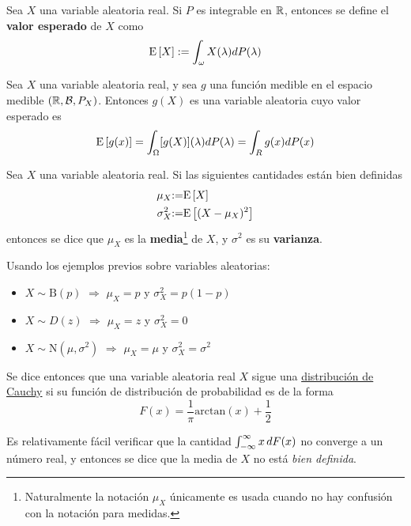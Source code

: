 \begin{definicion}
Sea $X$ una variable aleatoria real. Si $P$ es integrable en $\mathbb{R}$, entonces se define el \textbf{valor esperado} de $X$ como
\begin{equation}
\mathrm{E}\left[ X \right] := \int_\omega X(\lambda) dP(\lambda)
\end{equation}
\end{definicion}

\begin{proposicion}
Sea $X$ una variable aleatoria real, y sea $g$ una función medible en el espacio medible $(\mathbb{R},\mathcal{B},P_X)$. Entonces $g(X)$ es una variable aleatoria cuyo valor esperado es
\begin{equation}
\mathrm{E}\left[ g(x) \right] = \int_\Omega [g(X)](\lambda) dP(\lambda) = \int_R g(x) dP(x)
\end{equation}
\end{proposicion}

\begin{definicion}
Sea $X$ una variable aleatoria real. Si las siguientes cantidades están bien definidas
\begin{align}
\mu_X &{:=} \mathrm{E}\left[ X \right] \\
\sigma_X^{2} &{:=} \mathrm{E}\left[ (X-\mu_X)^{2} \right]
\end{align}
entonces se dice que $\mu_X$ es la \textbf{media}\footnote{Naturalmente la notación $\mu_X$ únicamente es usada cuando no hay confusión con la notación para medidas.} de $X$, y $\sigma^2$ es su \textbf{varianza}.
\end{definicion}

\begin{ejemplo}
Usando los ejemplos previos sobre variables aleatorias:
\begin{itemize}
\item $X\sim \text{B}(p)$ $\Rightarrow$ $\mu_X = p$ y $\sigma^2_X = p(1-p)$
\item $X\sim D(z)$ $\Rightarrow$ $\mu_X = z$ y $\sigma^2_X = 0$
\item $X\sim \text{N}(\mu,\sigma^{2})$ $\Rightarrow$ $\mu_X = \mu$ y $\sigma^2_X = \sigma^2$
\end{itemize}
\end{ejemplo}

\begin{ejemplo}
Se dice entonces que una variable aleatoria real $X$ sigue una \ul{distribuci\'on de Cauchy} si su función de distribución de probabilidad es de la forma
\begin{equation}
F(x) = \frac{1}{\pi} \mathrm{arc tan}\left( x \right) + \frac{1}{2}
\end{equation}

Es relativamente fácil verificar que la cantidad $\int_{-\infty}^{\infty} x\, dF(x)$ no converge a un número real, y entonces se dice que la media de $X$ no está \textit{bien definida}.
\end{ejemplo}

